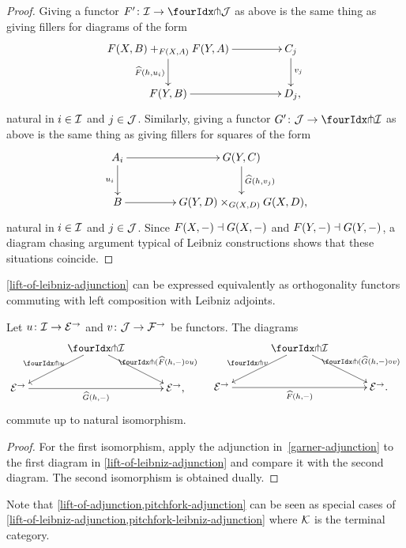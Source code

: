 \documentclass[reqno,10pt,a4paper,oneside,draft]{amsart}
\begin{document}
\begin{proof}
Giving a functor $F' \co \cal{I} \to \liftl{\cal{J}}$ as above is the same thing as giving fillers for diagrams of the form
\[
\xymatrix@C+2em{
  F(X,B) +_{F(X,A)} F(Y,A)
  \ar[d]_{\widehat{F}(h, u_i)}
  \ar[r]
&
  C_j
  \ar[d]^{v_j}
\\
  F(Y, B)
  \ar[r]
&
  D_j \rlap{,}
}
\]
natural in $i \in \cal{I}$ and $j \in \cal{J}$.
Similarly, giving a functor $G' \co \cal{J} \to \liftl{\cal{I}}$ as above is the same thing as giving fillers for squares of the form
\[
\xymatrix@C+2em{
  A_i
  \ar[d]_{u_i}
  \ar[r]
&
  G(Y, C)
  \ar[d]^{\widehat{G}(h, v_j)}
\\
  B
  \ar[r]
&
  G(Y,D) \times_{G(X,D)} G(X,D) \rlap{,}
}
\]
natural in $i \in \cal{I}$ and $j \in \cal{J}$.
Since $F(X, \arghole) \dashv G(X, \arghole)$ and $F(Y, \arghole) \dashv G(Y, \arghole)$, a diagram chasing argument typical of Leibniz constructions shows that these situations coincide.
\end{proof}

\cref{lift-of-leibniz-adjunction} can be expressed equivalently as orthogonality functors commuting with left composition with Leibniz adjoints.

\begin{corollary} \label{pitchfork-leibniz-adjunction}
Let $u \co \cal{I} \to \catE^\to$ and $v \co \cal{J} \to \cal{F}^\to$ be functors.
The diagrams
\begin{align*}
\xymatrix@C+1em{
  &  \liftr{\cal{I}}
  \ar[dr]^-{\liftr{(\widehat{F}(h, -) \cc u)}}
  \ar[dl]_-{\liftr{u}} &
\\
  \catE^\to
  \ar[rr]_-{\widehat{G}(h, -)}
& &
  \catE^\to
\rlap{,}}
&&
\xymatrix@C+1em{
 &  \liftl{\cal{I}}
  \ar[dl]_-{\liftl{v}}
  \ar[dr]^-{\liftl{(\widehat{G}(h, -) \cc v)}} &
\\
  \catE^\to
  \ar[rr]_-{\widehat{F}(h, -)}
& &
  \catE^\to
\rlap{.}}
\end{align*}
commute up to natural isomorphism.
\end{corollary}

\begin{proof}
For the first isomorphism, apply the adjunction in~\eqref{garner-adjunction} to the first diagram in \cref{lift-of-leibniz-adjunction} and compare it with the second diagram.
The second isomorphism is obtained dually.
\end{proof}

Note that \cref{lift-of-adjunction,pitchfork-adjunction} can be seen as special cases of \cref{lift-of-leibniz-adjunction,pitchfork-leibniz-adjunction} where $\cal{K}$ is the terminal category.
\end{document}
